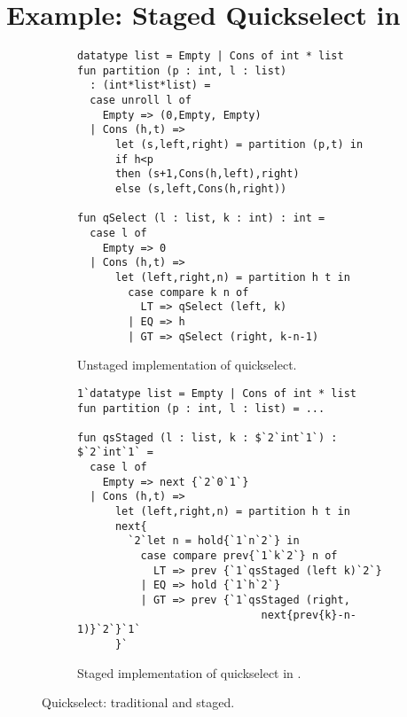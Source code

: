 \section {Example: Staged Quickselect in \texorpdfstring{\lang}{λ12}}
\label{sec:staging}



\begin{figure*}
\begin{subfigure}{0.5\textwidth}
\begin{lstlisting} 
datatype list = Empty | Cons of int * list
fun partition (p : int, l : list) 
  : (int*list*list) =
  case unroll l of 
    Empty => (0,Empty, Empty) 
  | Cons (h,t) =>
      let (s,left,right) = partition (p,t) in
      if h<p 
      then (s+1,Cons(h,left),right)
      else (s,left,Cons(h,right))

fun qSelect (l : list, k : int) : int = 
  case l of
    Empty => 0
  | Cons (h,t) => 
      let (left,right,n) = partition h t in
        case compare k n of
          LT => qSelect (left, k)
        | EQ => h
        | GT => qSelect (right, k-n-1)
\end{lstlisting}
\caption{Unstaged implementation of quickselect.}
\label{fig:quickselect}
\label{fig:qs-unstaged}
\end{subfigure}%
\begin{subfigure}{0.5\textwidth}
\begin{lstlisting} 
1`datatype list = Empty | Cons of int * list
fun partition (p : int, l : list) = ...

fun qsStaged (l : list, k : $`2`int`1`) : $`2`int`1` = 
  case l of
    Empty => next {`2`0`1`}
  | Cons (h,t) => 
      let (left,right,n) = partition h t in
      next{
        `2`let n = hold{`1`n`2`} in
          case compare prev{`1`k`2`} n of
            LT => prev {`1`qsStaged (left k)`2`}
          | EQ => hold {`1`h`2`}
          | GT => prev {`1`qsStaged (right, 
                             next{prev{k}-n-1)}`2`}`1`
      }`
\end{lstlisting}
\caption{Staged implementation of quickselect in \lang.}
\label{fig:qsstaged}
\label{fig:qs-staged}
\end{subfigure}
\caption{Quickselect: traditional and staged.}
\end{figure*}


